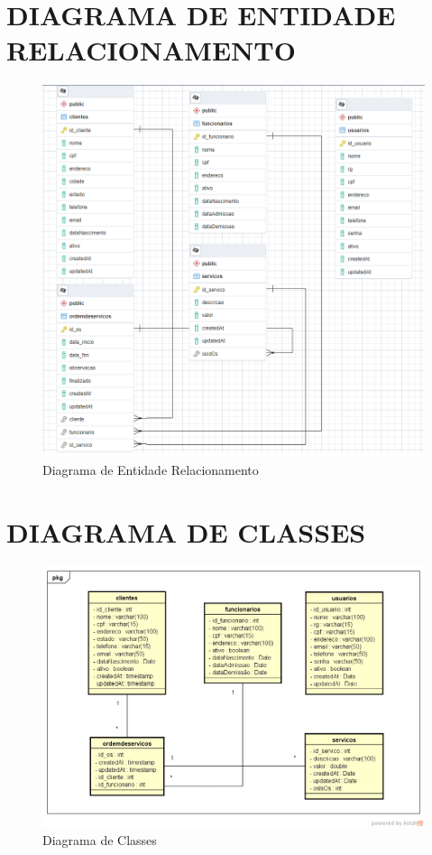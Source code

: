 \newpage
\section{DIAGRAMA DE ENTIDADE RELACIONAMENTO}
\begin{figure}[htb]
	\caption{\label{fig_diagrama-erd} Diagrama de Entidade Relacionamento}
	\begin{center}
	    \includegraphics[width=1\linewidth]{imagens/diagrama_ERD.png}
	\end{center}
\end{figure}

\newpage
\section{DIAGRAMA DE CLASSES}
\begin{figure}[htb]
	\caption{\label{fig_diagrama-classes} Diagrama de Classes}
	\begin{center}
	    \includegraphics[width=1\linewidth]{imagens/diagrama-de-classes.png}
	\end{center}
\end{figure}

